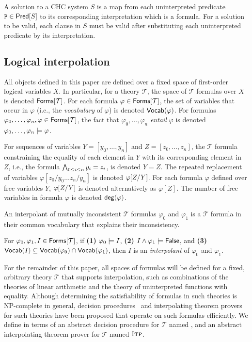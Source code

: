 A solution to a CHC system $S$ is a map from each uninterpreted
predicate $\cc{P} \in \predof{S}$ to its corresponding interpretation
which is a formula.
%
For a solution to be valid, each clause in $S$ must be valid after
substituting each uninterpreted predicate by its interpretation.

\subsection{Logical interpolation}
\label{sec:itps}
%
All objects defined in this paper are defined over a fixed space of
first-order logical variables $X$.
%
In particular, for a theory $\mathcal{T}$, the space of $\mathcal{T}$
formulas over $X$ is denoted $\tformulas{\mathcal{T}}$.
%
For each formula $\varphi \in \tformulas{\mathcal{T}}$, the set of
variables that occur in $\varphi$ (i.e., the \emph{vocabulary} of
$\varphi$) is denoted $\vocab(\varphi)$.
%
For formulas $\varphi_0, \ldots, \varphi_n, \varphi \in
\tformulas{\mathcal{T}}$, the fact that $\varphi_0, \ldots, \varphi_n$
\emph{entail} $\varphi$ is denoted $\varphi_0, \ldots, \varphi_n
\entails \varphi$.

For sequences of variables $Y = [ y_0, \ldots, y_n ]$ and $Z = [ z_0,
\ldots, z_n ]$, the $\mathcal{T}$ formula constraining the equality of
each element in $Y$ with its corresponding element in $Z$, i.e., the
formula $\bigland_{0 \leq i \leq n} y_i = z_i$, is denoted $Y = Z$.
%
The repeated replacement of variables $\varphi[ z_0 / y_0 \ldots z_{n}
/ y_{n} ]$ is denoted $\replace{\varphi}{Y}{Z}$.
%
For each formula $\varphi$ defined over free variables $Y$,
$\replace{\varphi}{Y}{Z}$ is denoted alternatively as $\varphi[ Z ]$.
%
The number of free variables in formula $\varphi$ is denoted
$\degreeof{\varphi}$.

An interpolant of mutually inconsistent $\mathcal{T}$ formulas
$\varphi_0$ and $\varphi_1$ is a $\mathcal{T}$ formula in their common
vocabulary that explains their inconsistency.
%
\begin{defn}
  \label{defn:itps}
  For $\varphi_0, \varphi_1, I \in \tformulas{\mathcal{T}}$, if
  \textbf{(1)} $\varphi_0 \entails I$, %
  \textbf{(2)} $I \land \varphi_1 \entails \false$, and %
  \textbf{(3)} $\vocab(I) \subseteq \vocab(\varphi_0) \intersection
  \vocab(\varphi_1)$,
  then $I$ is an \emph{interpolant} of $\varphi_0$ and $\varphi_1$.
\end{defn}
%
For the remainder of this paper, all spaces of formulas will be
defined for a fixed, arbitrary theory $\mathcal{T}$ that supports
interpolation, such as combinations of the theories of linear
arithmetic and the theory of uninterpreted functions with equality.
Although determining the satisfiability of formulas in such theories
is NP-complete in general, decision procedures~\cite{moura08} and
interpolating theorem provers~\cite{mcmillan04} for such theories have
been proposed that operate on such formulas efficiently.
%
We define \sys in terms of an abstract decision procedure for
$\mathcal{T}$ named \issat, and an abstract interpolating theorem
prover for $\mathcal{T}$ named $\solveitp$.
